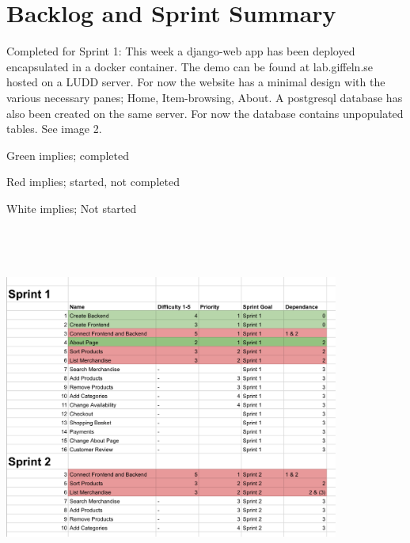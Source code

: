 \newpage

\section{Backlog and Sprint Summary}

Completed for Sprint 1: This week a django-web app has been deployed
encapsulated in a docker container. The demo can be found at lab.giffeln.se
hosted on a LUDD server. For now the website has a minimal design with the
various necessary panes; Home, Item-browsing, About. A postgresql database
has also been created on the same server. For now the database contains
unpopulated tables. See image 2.

Green implies; completed

Red implies; started, not completed 

White implies; Not started

\includegraphics[height=12cm, width=11cm]{backlog.png}
